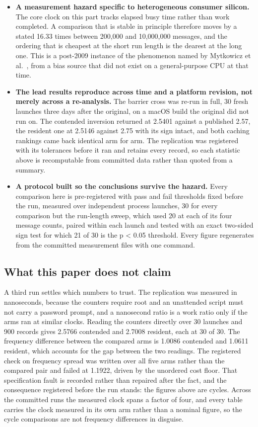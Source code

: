 \documentclass[conference]{IEEEtran}
\begin{document}
\begin{itemize}
\item \textbf{A measurement hazard specific to heterogeneous consumer silicon.}
The core clock on this part tracks elapsed busy time rather than work
completed. A comparison that is stable in principle therefore moves by a stated
16.33 times between 200,000 and 10,000,000 messages, and the ordering that is
cheapest at the short run length is the dearest at the long one. This is a post-2009 instance of the
phenomenon named by Mytkowicz et al.~\cite{mytkowicz2009wrong}, from a bias
source that did not exist on a general-purpose CPU at that time.

\item \textbf{The lead results reproduce across time and a platform revision,
not merely across a re-analysis.} The barrier cross was re-run in full, 30
fresh launches three days after the original, on a macOS build the original
did not run on. The contended inversion returned at 2.5401 against a published
2.57, the resident one at 2.5146 against 2.75 with its sign intact, and both
caching rankings came back identical arm for arm. The replication was
registered with its tolerances before it ran and retains every record, so each
statistic above is recomputable from committed data rather than quoted from a
summary.

\item \textbf{A protocol built so the conclusions survive the hazard.} Every
comparison here is pre-registered with pass and fail thresholds fixed before
the run, measured over independent process launches, 30 for every comparison
but the run-length sweep, which used 20 at each of its four message counts,
paired within each launch and tested with an exact two-sided sign test for
which 21 of 30 is the p < 0.05 threshold. Every figure regenerates from the committed
measurement files with one command.
\end{itemize}

\subsection{What this paper does not claim}

A third run settles which numbers to trust. The replication was measured in
nanoseconds, because the counters require root and an unattended script must
not carry a password prompt, and a nanosecond ratio is a work ratio only if the
arms ran at similar clocks. Reading the counters directly over 30 launches and
900 records gives 2.5766 contended and 2.7008 resident, each at 30 of 30.
The frequency difference between the compared arms is 1.0086 contended and
1.0611 resident, which accounts for the gap between the two readings. The
registered check on frequency spread was written over all five arms rather than
the compared pair and failed at 1.1922, driven by the unordered cost floor.
That specification fault is recorded rather than repaired after the fact, and
the consequence registered before the run stands: the figures above are
cycles.
Across the committed runs the measured clock spans a factor of four, and every
table carries the clock measured in its own arm rather than a nominal figure,
so the cycle comparisons are not frequency differences in disguise.
\end{document}
